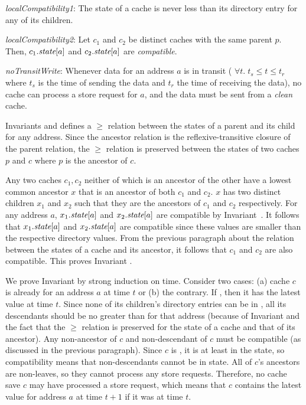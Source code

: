 \begin{inv}
\textit{localCompatibility1}:
The state of a cache is never less than its directory entry for any of
its children.
\label{localCompatibility1}
\end{inv}
\begin{inv}
\textit{localCompatibility2}: Let $c_1$ and $c_2$ be distinct caches with the
same parent $p$. Then, $c_1.\textit{state}[a]$ and $c_2.\textit{state}[a]$ are
\textit{compatible}.
\label{localCompatibility2}
\end{inv}

\begin{inv}
\textit{noTransitWrite}: Whenever data for an address $a$ is in transit (\ie{}
$\forall t. \; t_s \le t \le t_r$ where $t_s$ is the time of sending the data and
$t_r$ the time of receiving the data), no cache can process a store request for
$a$, and the data must be sent from a \textit{clean} cache.
\label{noTransitWrite}
\end{inv}

Invariants  and  defines a
$\ge$ relation between the states of a parent and its child for any address.
Since the ancestor relation is the reflexive-transitive closure of the parent
relation, the $\ge$ relation is preserved between the states of two caches $p$
and $c$ where $p$ is the ancestor of $c$.

Any two caches $c_1, c_2$ neither of which is an ancestor of the other have a
lowest common ancestor $x$ that is an ancestor of both $c_1$ and $c_2$. $x$
has two distinct children $x_1$ and $x_2$ such that they are the ancestors of
$c_1$ and $c_2$ respectively. For any address $a$, $x_1.\textit{state}[a]$ and
$x_2.\textit{state}[a]$ are compatible by 
Invariant~. It follows that $x_1.\textit{state}[a]$ and
$x_2.\textit{state}[a]$ are compatible since these values are smaller than the
respective directory values. From the previous paragraph about the relation
between the states of a cache and its ancestor, it follows that $c_1$ and $c_2$
are also compatible. This proves Invariant .

We prove Invariant  by strong induction on time. Consider
two cases: (a) cache $c$ is already \clean{} for an address $a$ at time $t$ or
(b) the contrary.  If \clean{}, then it has the latest value at time $t$. Since
none of its children's directory entries can be in \Mo{}, all its descendants
should be no greater than \Sh{} for that address (because of Invariant
 and the fact that the $\ge$ relation is preserved for the
state of a cache and that of its ancestor). Any non-ancestor of $c$ and
non-descendant of $c$ must be compatible (as discussed in the previous
paragraph).  Since $c$ is \clean, it is at least in the \Sh{} state, so
compatibility means that non-descendants cannot be in \Mo{} state. All of
$c$'s ancestors are non-leaves, so they cannot process any store requests.
Therefore, no cache save $c$ may have processed a store request, which means that
$c$ contains the latest value for address $a$ at time $t+1$ if it was \clean{}
at time $t$.

